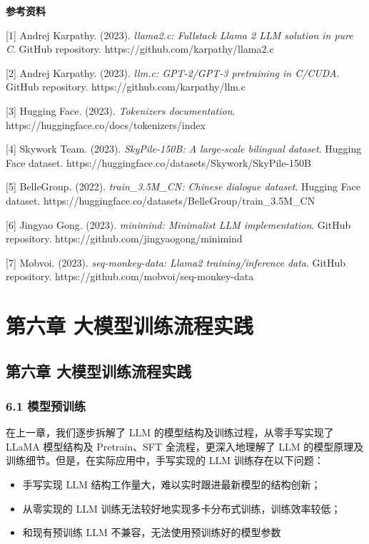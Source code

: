 \documentclass[12pt,a4paper]{book}
\begin{document}
\textbf{参考资料}

{[}1{]} Andrej Karpathy. (2023). \emph{llama2.c: Fullstack Llama 2 LLM
solution in pure C}. GitHub repository.
https://github.com/karpathy/llama2.c

{[}2{]} Andrej Karpathy. (2023). \emph{llm.c: GPT-2/GPT-3 pretraining in
C/CUDA}. GitHub repository. https://github.com/karpathy/llm.c

{[}3{]} Hugging Face. (2023). \emph{Tokenizers documentation}.
https://huggingface.co/docs/tokenizers/index

{[}4{]} Skywork Team. (2023). \emph{SkyPile-150B: A large-scale
bilingual dataset}. Hugging Face dataset.
https://huggingface.co/datasets/Skywork/SkyPile-150B

{[}5{]} BelleGroup. (2022). \emph{train\_3.5M\_CN: Chinese dialogue
dataset}. Hugging Face dataset.
https://huggingface.co/datasets/BelleGroup/train\_3.5M\_CN

{[}6{]} Jingyao Gong. (2023). \emph{minimind: Minimalist LLM
implementation}. GitHub repository.
https://github.com/jingyaogong/minimind

{[}7{]} Mobvoi. (2023). \emph{seq-monkey-data: Llama2 training/inference
data}. GitHub repository. https://github.com/mobvoi/seq-monkey-data

\chapter{第六章 大模型训练流程实践}
{
\setcounter{tocdepth}{3}
\tableofcontents
}
\section{第六章
大模型训练流程实践}\label{ux7b2cux516dux7ae0-ux5927ux6a21ux578bux8badux7ec3ux6d41ux7a0bux5b9eux8df5}

\subsection{6.1 模型预训练}\label{ux6a21ux578bux9884ux8badux7ec3}

在上一章，我们逐步拆解了 LLM 的模型结构及训练过程，从零手写实现了 LLaMA
模型结构及 Pretrain、SFT 全流程，更深入地理解了 LLM
的模型原理及训练细节。但是，在实际应用中，手写实现的 LLM
训练存在以下问题：

\begin{itemize}
\tightlist
\item
  手写实现 LLM 结构工作量大，难以实时跟进最新模型的结构创新；
\item
  从零实现的 LLM 训练无法较好地实现多卡分布式训练，训练效率较低；
\item
  和现有预训练 LLM 不兼容，无法使用预训练好的模型参数
\end{itemize}
\end{document}

